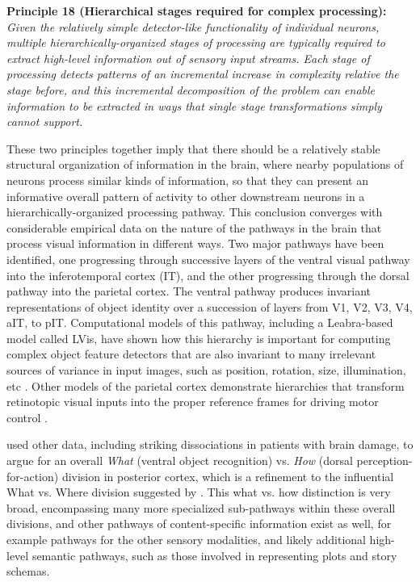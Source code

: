 \documentclass[11pt,twoside]{article}
\begin{document}
{\bf Principle 18 (Hierarchical stages required for complex processing):} {\em Given the relatively simple detector-like functionality of individual neurons, multiple hierarchically-organized stages of processing are typically required to extract high-level information out of sensory input streams.  Each stage of processing detects patterns of an incremental increase in complexity relative the stage before, and this incremental decomposition of the problem can enable information to be extracted in ways that single stage transformations simply cannot support.}

These two principles together imply that there should be a relatively stable structural organization of information in the brain, where nearby populations of neurons process similar kinds of information, so that they can present an informative overall pattern of activity to other downstream neurons in a hierarchically-organized processing pathway.  This conclusion converges with considerable empirical data on the nature of the pathways in the brain that process visual information in different ways.  Two major pathways have been identified, one progressing through successive layers of the ventral visual pathway into the inferotemporal cortex (IT), and the other progressing through the dorsal pathway into the parietal cortex.  The ventral pathway produces invariant representations of object identity over a succession of layers from V1, V2, V3, V4, aIT, to pIT.  Computational models of this pathway, including a Leabra-based model called LVis, have shown how this hierarchy is important for computing complex object feature detectors that are also invariant to many irrelevant sources of variance in input images, such as position, rotation, size, illumination, etc \cite{OReillyEtAlIP,PoggioModels}.  Other models of the parietal cortex demonstrate hierarchies that transform retinotopic visual inputs into the proper reference frames for driving motor control \cite{PougetEtAl}.  

 used other data, including striking dissociations in patients with brain damage, to argue for an overall {\em What} (ventral object recognition) vs. {\em How} (dorsal perception-for-action) division in posterior cortex, which is a refinement to the influential What vs. Where division suggested by .  This what vs. how distinction is very broad, encompassing many more specialized sub-pathways within these overall divisions, and other pathways of content-specific information exist as well, for example pathways for the other sensory modalities, and likely additional high-level semantic pathways, such as those involved in representing plots and story schemas.
\end{document}
